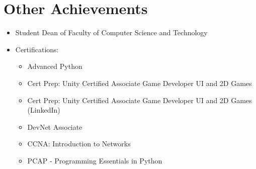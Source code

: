 \documentclass{article}
\begin{document}
\section*{Other Achievements}
\begin{itemize}
    \item Student Dean of Faculty of Computer Science and Technology
    \item Certifications:
    \begin{itemize}
        \item Advanced Python
        \item Cert Prep: Unity Certified Associate Game Developer UI and 2D Games
        \item Cert Prep: Unity Certified Associate Game Developer UI and 2D Games (LinkedIn)
        \item DevNet Associate
        \item CCNA: Introduction to Networks
        \item PCAP - Programming Essentials in Python
    \end{itemize}
\end{itemize}
\end{document}
